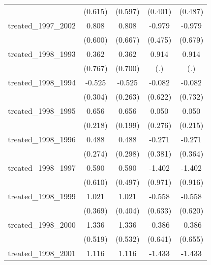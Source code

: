 {\begin{tabular}{l*{4}{c}}
            &     (0.615)         &     (0.597)         &     (0.401)         &     (0.487)         \\
[1em]
treated\_1997\_2002&       0.808         &       0.808         &      -0.979\sym{*}  &      -0.979         \\
            &     (0.600)         &     (0.667)         &     (0.475)         &     (0.679)         \\
[1em]
treated\_1998\_1993&       0.362         &       0.362         &       0.914         &       0.914         \\
            &     (0.767)         &     (0.700)         &         (.)         &         (.)         \\
[1em]
treated\_1998\_1994&      -0.525         &      -0.525\sym{*}  &      -0.082         &      -0.082         \\
            &     (0.304)         &     (0.263)         &     (0.622)         &     (0.732)         \\
[1em]
treated\_1998\_1995&       0.656\sym{**} &       0.656\sym{***}&       0.050         &       0.050         \\
            &     (0.218)         &     (0.199)         &     (0.276)         &     (0.215)         \\
[1em]
treated\_1998\_1996&       0.488         &       0.488         &      -0.271         &      -0.271         \\
            &     (0.274)         &     (0.298)         &     (0.381)         &     (0.364)         \\
[1em]
treated\_1998\_1997&       0.590         &       0.590         &      -1.402         &      -1.402         \\
            &     (0.610)         &     (0.497)         &     (0.971)         &     (0.916)         \\
[1em]
treated\_1998\_1999&       1.021\sym{**} &       1.021\sym{*}  &      -0.558         &      -0.558         \\
            &     (0.369)         &     (0.404)         &     (0.633)         &     (0.620)         \\
[1em]
treated\_1998\_2000&       1.336\sym{*}  &       1.336\sym{*}  &      -0.386         &      -0.386         \\
            &     (0.519)         &     (0.532)         &     (0.641)         &     (0.655)         \\
[1em]
treated\_1998\_2001&       1.116\sym{*}  &       1.116\sym{***}&      -1.433\sym{*}  &      -1.433\sym{***}\\

\end{tabular}}
